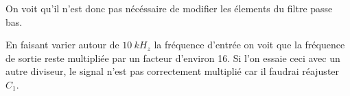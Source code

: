 \documentclass[11pt, openright]{book}
\begin{document}
\begin{figure}[ht]
    \begin{floatrow}



    \end{floatrow}
\end{figure}

On voit qu'il n'est donc pas nécéssaire de modifier les élements du filtre passe bas.

En faisant varier autour de $10\ kH_z$ la fréquence d'entrée on voit que la fréquence de sortie reste multipliée par un facteur d'environ 16. Si l'on essaie ceci avec un autre diviseur, le signal n'est pas correctement multiplié car il faudrai réajuster $C_1$.
\end{document}
